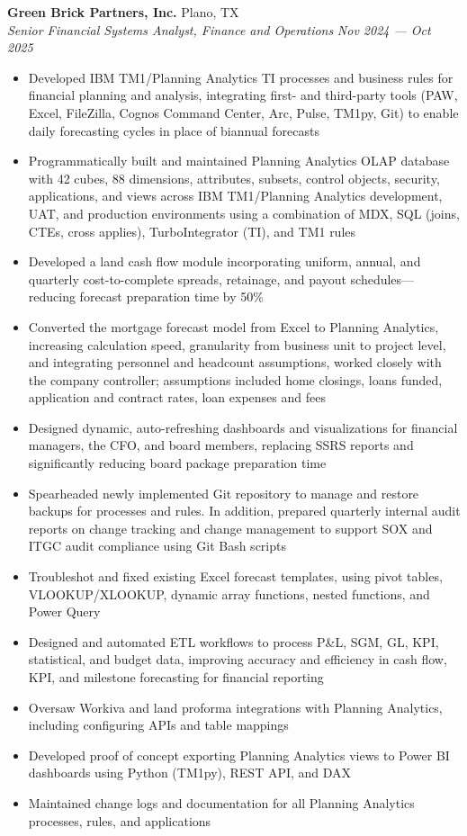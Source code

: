\documentclass[a4paper,11pt]{article}
\begin{document}
\vspace{1mm}
\textbf{Green Brick Partners, Inc.} \hfill Plano, TX \\
\textit{Senior Financial Systems Analyst, Finance and Operations} \hfill \textit{Nov 2024 --- Oct 2025} 
\begin{itemize}
    \item Developed IBM TM1/Planning Analytics TI processes and business rules for financial planning and analysis, integrating first- and third-party tools (PAW, Excel, FileZilla, Cognos Command Center, Arc, Pulse, TM1py, Git) to enable daily forecasting cycles in place of biannual forecasts  
    \item Programmatically built and maintained Planning Analytics OLAP database with 42 cubes, 88 dimensions, attributes, subsets, control objects, security, applications, and views across IBM TM1/Planning Analytics development, UAT, and production environments using a combination of MDX, SQL (joins, CTEs, cross applies), TurboIntegrator (TI), and TM1 rules  
    \item Developed a land cash flow module incorporating uniform, annual, and quarterly cost-to-complete spreads, retainage, and payout schedules—reducing forecast preparation time by 50\%
    \item Converted the mortgage forecast model from Excel to Planning Analytics, increasing calculation speed, granularity from business unit to project level, and integrating personnel and headcount assumptions, worked closely with the company controller; assumptions included home closings, loans funded, application and contract rates, loan expenses and fees
    \item Designed dynamic, auto-refreshing dashboards and visualizations for financial managers, the CFO, and board members, replacing SSRS reports and significantly reducing board package preparation time
    \item Spearheaded newly implemented Git repository to manage and restore backups for processes and rules. In addition, prepared quarterly internal audit reports on change tracking and change management to support SOX and ITGC audit compliance using Git Bash scripts
    \item Troubleshot and fixed existing Excel forecast templates, using pivot tables, VLOOKUP/XLOOKUP, dynamic array functions, nested functions, and Power Query
    \item Designed and automated ETL workflows to process P\&L, SGM, GL, KPI, statistical, and budget data, improving accuracy and efficiency in cash flow, KPI, and milestone forecasting for financial reporting  
    \item Oversaw Workiva and land proforma integrations with Planning Analytics, including configuring APIs and table mappings
    \item Developed proof of concept exporting Planning Analytics views to Power BI dashboards using Python (TM1py), REST API, and DAX
    \item Maintained change logs and documentation for all Planning Analytics processes, rules, and applications
\end{itemize}
\vspace{1mm}
\end{document}
